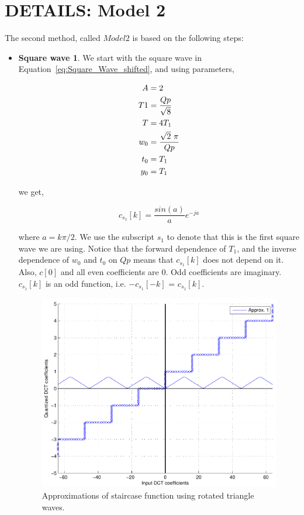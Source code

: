 \documentclass[12pt]{article}
\begin{document}
\section{DETAILS: Model 2}

The second method, called $Model 2$ is based on the following steps:
  
\begin{itemize}
\item \textbf{Square wave 1}.  We start with the square wave in Equation~\ref{eq:Square_Wave_shifted}, and using parameters, %

		\begin{align}
		\label{eq:Parameter_values_1}
		A		&=	2\notag\\
		T1	&=	\frac{Qp}{\sqrt{8}}\notag\\ 
		T		&=	4T_1\notag\\
		w_0	&=	\frac{\sqrt{2} \  \pi}{Qp}\notag\\ 
		t_0	&=	T_1\\
		y_0	&=	T_1\notag
		\end{align}	
		
we get,
	
		\begin{equation}
		c_{s_1}[k] = \frac{sin(a)}{a}e^{-ja}
		\label{eq:Square_1_ck}
		\end{equation}
		
where $a=k\pi/2$.  We use the subscript $s_1$ to denote that this is the first square wave we are using.  Notice that the forward dependence of $T_1$, and the inverse dependence of $w_0$ and $t_0$ on $Qp$ means that $c_{s_1}[k]$ does not depend on it.  Also, $c[0]$ and all even coefficients are $0$.  Odd coefficients are imaginary.  $c_{s_1}[k]$ is an odd function, i.e.  $-c_{s_1}[-k]$ = $c_{s_1}[k]$.

		\begin{figure}
		\centering
		\includegraphics[width=.45\textwidth]{figs/Quantization_7_result_plot_first_triangleWave}		
		\caption{Approximations of staircase function using rotated triangle waves.}
		\label{fig:Creating_model_2} 		
    \end{figure} 
    

\end{itemize}
\end{document}
